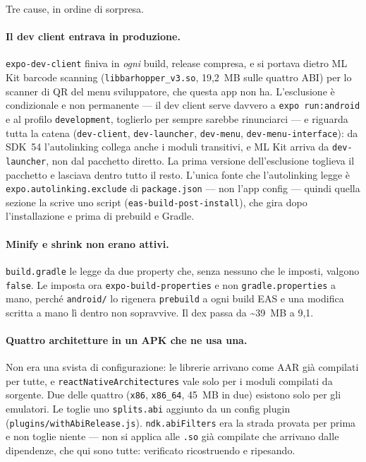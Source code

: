 \documentclass[11pt,a4paper]{report}
\begin{document}
Tre cause, in ordine di sorpresa.

\paragraph{Il dev client entrava in produzione.} \texttt{expo-dev-client}
finiva in \emph{ogni} build, release compresa, e si portava dietro ML Kit
barcode scanning (\texttt{libbarhopper\_v3.so}, 19,2~MB sulle quattro ABI) per
lo scanner di QR del menu sviluppatore, che questa app non ha. L'esclusione \`e
condizionale e non permanente --- il dev client serve davvero a
\texttt{expo run:android} e al profilo \texttt{development}, toglierlo per
sempre sarebbe rinunciarci --- e riguarda tutta la catena
(\texttt{dev-client}, \texttt{dev-launcher}, \texttt{dev-menu},
\texttt{dev-menu-interface}): da SDK~54 l'autolinking collega anche i moduli
transitivi, e ML Kit arriva da \texttt{dev-launcher}, non dal pacchetto
diretto. La prima versione dell'esclusione toglieva il pacchetto e lasciava
dentro tutto il resto. L'unica fonte che l'autolinking legge \`e
\texttt{expo.autolinking.exclude} di \texttt{package.json} --- non l'app config
--- quindi quella sezione la scrive uno script (\texttt{eas-build-post-install}),
che gira dopo l'installazione e prima di prebuild e Gradle.

\paragraph{Minify e shrink non erano attivi.} \texttt{build.gradle} le legge da
due property che, senza nessuno che le imposti, valgono \texttt{false}. Le
imposta ora \texttt{expo-build-properties} e non \texttt{gradle.properties} a
mano, perch\'e \texttt{android/} lo rigenera \texttt{prebuild} a ogni build EAS
e una modifica scritta a mano l\`i dentro non sopravvive. Il dex passa da
\textasciitilde39~MB a 9,1.

\paragraph{Quattro architetture in un APK che ne usa una.} Non era una svista
di configurazione: le librerie arrivano come AAR gi\`a compilati per tutte, e
\texttt{reactNativeArchitectures} vale solo per i moduli compilati da sorgente.
Due delle quattro (\texttt{x86}, \texttt{x86\_64}, 45~MB in due) esistono solo
per gli emulatori. Le toglie uno \texttt{splits.abi} aggiunto da un config
plugin (\texttt{plugins/withAbiRelease.js}). \texttt{ndk.abiFilters} era la
strada provata per prima e non toglie niente --- non si applica alle
\texttt{.so} gi\`a compilate che arrivano dalle dipendenze, che qui sono tutte:
verificato ricostruendo e ripesando.
\end{document}
